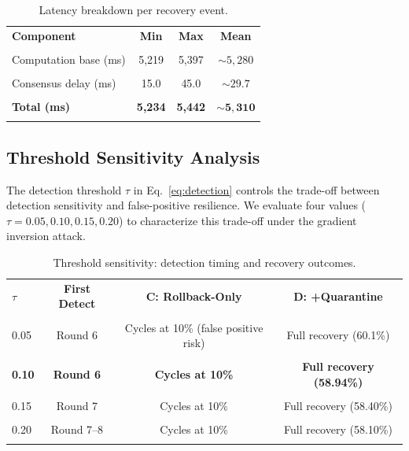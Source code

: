 \documentclass[conference]{IEEEtran}
\begin{document}
\begin{table}[t]
\centering
\caption{Latency breakdown per recovery event.}
\label{tab:latency}
\vspace{-3pt}
\begin{tabular}{lccc}
\toprule
\textbf{Component} & \textbf{Min} & \textbf{Max} & \textbf{Mean} \\\\
\midrule
Computation base (ms) & 5,219 & 5,397 & $\sim 5{,}280$ \\\\
Consensus delay (ms) & 15.0 & 45.0 & $\sim 29.7$ \\\\
\textbf{Total (ms)} & \textbf{5,234} & \textbf{5,442} & $\mathbf{\sim 5{,}310}$ \\\\
\bottomrule
\end{tabular}
\end{table}

\subsection{Threshold Sensitivity Analysis}
\label{sec:threshold}
The detection threshold $\tau$ in Eq.~\ref{eq:detection} controls the trade-off between detection sensitivity and false-positive resilience. We evaluate four values ($\tau = 0.05, 0.10, 0.15, 0.20$) to characterize this trade-off under the gradient inversion attack.

\begin{table}[t]
\centering
\caption{Threshold sensitivity: detection timing and recovery outcomes.}
\label{tab:threshold}
\vspace{-3pt}
\begin{tabular}{lccc}
\toprule
\textbf{$\tau$} & \textbf{First Detect} & \textbf{C: Rollback-Only} & \textbf{D: +Quarantine} \\\\
\midrule
0.05 & Round 6 & Cycles at 10\% (false positive risk) & Full recovery (60.1\%) \\\\
\textbf{0.10} & \textbf{Round 6} & \textbf{Cycles at 10\%} & \textbf{Full recovery (58.94\%)} \\\\
0.15 & Round 7 & Cycles at 10\% & Full recovery (58.40\%) \\\\
0.20 & Round 7--8 & Cycles at 10\% & Full recovery (58.10\%) \\\\
\bottomrule
\end{tabular}
\end{table}
\end{document}

